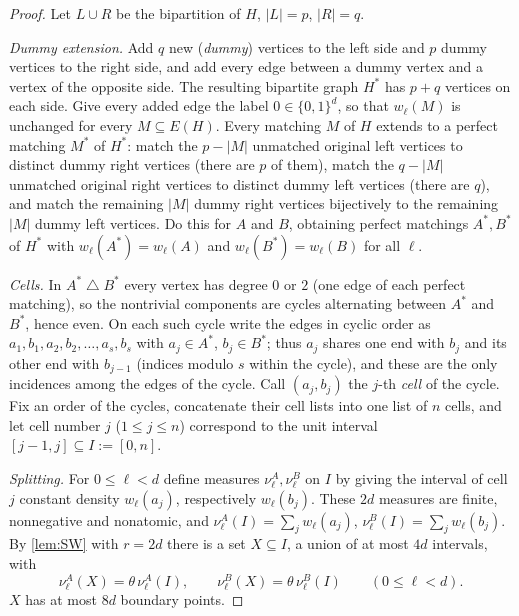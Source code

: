 \documentclass[11pt,a4paper]{article}
\theoremstyle{plain}
\theoremstyle{definition}
\theoremstyle{remark}
\newcommand{\symdiff}{\mathbin{\triangle}}
\begin{document}
\label{pf:interp}
\leminterp*
\begin{proof}
Let $L\cup R$ be the bipartition of $H$, $|L|=p$, $|R|=q$.

\emph{Dummy extension.} Add $q$ new (\emph{dummy}) vertices to the left side and $p$ dummy vertices to the right side, and add every edge between a dummy vertex and a vertex of the opposite side. The resulting bipartite graph $H^*$ has $p+q$ vertices on each side. Give every added edge the label $0\in\{0,1\}^d$, so that $w_\ell(M)$ is unchanged for every $M\subseteq E(H)$. Every matching $M$ of $H$ extends to a perfect matching $M^*$ of $H^*$: match the $p-|M|$ unmatched original left vertices to distinct dummy right vertices (there are $p$ of them), match the $q-|M|$ unmatched original right vertices to distinct dummy left vertices (there are $q$), and match the remaining $|M|$ dummy right vertices bijectively to the remaining $|M|$ dummy left vertices. Do this for $A$ and $B$, obtaining perfect matchings $A^*,B^*$ of $H^*$ with $w_\ell(A^*)=w_\ell(A)$ and $w_\ell(B^*)=w_\ell(B)$ for all $\ell$.

\emph{Cells.} In $A^*\symdiff B^*$ every vertex has degree $0$ or $2$ (one edge of each perfect matching), so the nontrivial components are cycles alternating between $A^*$ and $B^*$, hence even. On each such cycle write the edges in cyclic order as $a_1,b_1,a_2,b_2,\dots,a_s,b_s$ with $a_j\in A^*$, $b_j\in B^*$; thus $a_j$ shares one end with $b_j$ and its other end with $b_{j-1}$ (indices modulo $s$ within the cycle), and these are the only incidences among the edges of the cycle. Call $(a_j,b_j)$ the $j$-th \emph{cell} of the cycle. Fix an order of the cycles, concatenate their cell lists into one list of $n$ cells, and let cell number $j$ ($1\le j\le n$) correspond to the unit interval $[j-1,j]\subseteq I:=[0,n]$.

\emph{Splitting.} For $0\le\ell<d$ define measures $\nu^A_\ell,\nu^B_\ell$ on $I$ by giving the interval of cell $j$ constant density $w_\ell(a_j)$, respectively $w_\ell(b_j)$. These $2d$ measures are finite, nonnegative and nonatomic, and $\nu^A_\ell(I)=\sum_jw_\ell(a_j)$, $\nu^B_\ell(I)=\sum_jw_\ell(b_j)$. By \cref{lem:SW} with $r=2d$ there is a set $X\subseteq I$, a union of at most $4d$ intervals, with
\[
 \nu^A_\ell(X)=\theta\,\nu^A_\ell(I),\qquad \nu^B_\ell(X)=\theta\,\nu^B_\ell(I)\qquad(0\le\ell<d).
\]
$X$ has at most $8d$ boundary points.


\end{proof}
\end{document}
